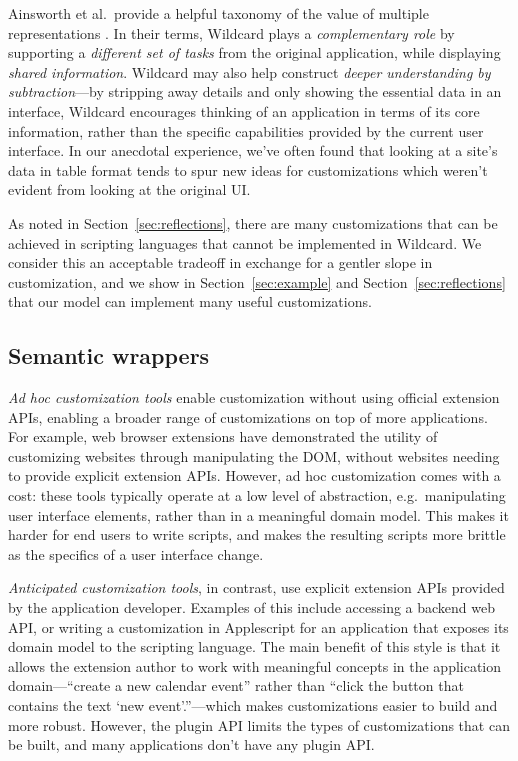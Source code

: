 \documentclass[sigplan,screen,10pt,anonymous,review]{acmart}
\begin{document}
Ainsworth et al.~provide a helpful taxonomy of the value of multiple
representations \citep{ainsworth1999}. In their terms, Wildcard plays a
\emph{complementary role} by supporting a \emph{different set of tasks}
from the original application, while displaying \emph{shared
information}. Wildcard may also help construct \emph{deeper
understanding by subtraction}---by stripping away details and only
showing the essential data in an interface, Wildcard encourages thinking
of an application in terms of its core information, rather than the
specific capabilities provided by the current user interface. In our
anecdotal experience, we've often found that looking at a site's data in
table format tends to spur new ideas for customizations which weren't
evident from looking at the original UI.

As noted in Section~\ref{sec:reflections}, there are many customizations
that can be achieved in scripting languages that cannot be implemented
in Wildcard. We consider this an acceptable tradeoff in exchange for a
gentler slope in customization, and we show in Section~\ref{sec:example}
and Section~\ref{sec:reflections} that our model can implement many
useful customizations.

\hypertarget{semantic-wrappers}{%
\subsection{Semantic wrappers}\label{semantic-wrappers}}

\emph{Ad hoc customization tools} enable customization without using
official extension APIs, enabling a broader range of customizations on
top of more applications. For example, web browser extensions have
demonstrated the utility of customizing websites through manipulating
the DOM, without websites needing to provide explicit extension APIs.
However, ad hoc customization comes with a cost: these tools typically
operate at a low level of abstraction, e.g.~manipulating user interface
elements, rather than in a meaningful domain model. This makes it harder
for end users to write scripts, and makes the resulting scripts more
brittle as the specifics of a user interface change.

\emph{Anticipated customization tools}, in contrast, use explicit
extension APIs provided by the application developer. Examples of this
include accessing a backend web API, or writing a customization in
Applescript for an application that exposes its domain model to the
scripting language. The main benefit of this style is that it allows the
extension author to work with meaningful concepts in the application
domain---``create a new calendar event'' rather than ``click the button
that contains the text `new event'.''---which makes customizations
easier to build and more robust. However, the plugin API limits the
types of customizations that can be built, and many applications don't
have any plugin API.
\end{document}
